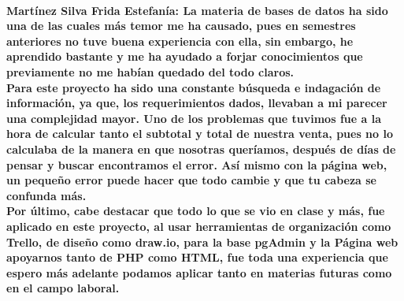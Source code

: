 \documentclass{article}
\begin{document}
    \paragraph{Martínez Silva Frida Estefanía: La materia de bases de datos ha sido una de las cuales más temor me ha causado, pues en semestres anteriores no tuve buena experiencia con ella, sin embargo, he aprendido bastante y me ha ayudado a forjar conocimientos que previamente no me habían quedado del todo claros. 
    \\Para este proyecto ha sido una constante búsqueda e indagación de información, ya que, los requerimientos dados, llevaban a mi parecer una complejidad mayor. Uno de los problemas que tuvimos fue a la hora de calcular tanto el subtotal y total de nuestra venta, pues no lo calculaba de la manera en que nosotras queríamos, después de días de pensar y buscar encontramos el error. Así mismo con la página web, un pequeño error puede hacer que todo cambie y que tu cabeza se confunda más. 
    \\Por último, cabe destacar que todo lo que se vio en clase y más, fue aplicado en este proyecto, al usar herramientas de organización como Trello, de diseño como draw.io, para la base pgAdmin y la Página web apoyarnos tanto de PHP como HTML, fue toda una experiencia que espero más adelante podamos aplicar tanto en materias futuras como en el campo laboral.}
    
\end{document}
